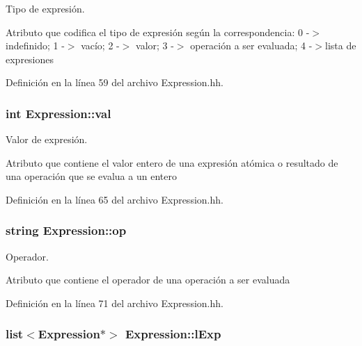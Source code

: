Tipo de expresión. 

Atributo que codifica el tipo de expresión según la correspondencia\+: 0 -\/$>$ indefinido; 1 -\/$>$ vacío; 2 -\/$>$ valor; 3 -\/$>$ operación a ser evaluada; 4 -\/$>$lista de expresiones 

Definición en la línea 59 del archivo Expression.\+hh.

\subsubsection[{\texorpdfstring{val}{val}}]{\setlength{\rightskip}{0pt plus 5cm}int Expression\+::val\hspace{0.3cm}{\ttfamily [private]}}\hypertarget{class_expression_a9c15b529b5d59e6bffb3855e384c04aa}{}\label{class_expression_a9c15b529b5d59e6bffb3855e384c04aa}


Valor de expresión. 

Atributo que contiene el valor entero de una expresión atómica o resultado de una operación que se evalua a un entero 

Definición en la línea 65 del archivo Expression.\+hh.

\subsubsection[{\texorpdfstring{op}{op}}]{\setlength{\rightskip}{0pt plus 5cm}string Expression\+::op\hspace{0.3cm}{\ttfamily [private]}}\hypertarget{class_expression_a30856695b46075ada151f6f6cdfb9fa8}{}\label{class_expression_a30856695b46075ada151f6f6cdfb9fa8}


Operador. 

Atributo que contiene el operador de una operación a ser evaluada 

Definición en la línea 71 del archivo Expression.\+hh.

\subsubsection[{\texorpdfstring{l\+Exp}{lExp}}]{\setlength{\rightskip}{0pt plus 5cm}list$<${\bf Expression}$\ast$$>$ Expression\+::l\+Exp\hspace{0.3cm}{\ttfamily [private]}}\hypertarget{class_expression_afb4f4617291f7e182cbf2252151b122a}{}\label{class_expression_afb4f4617291f7e182cbf2252151b122a}


